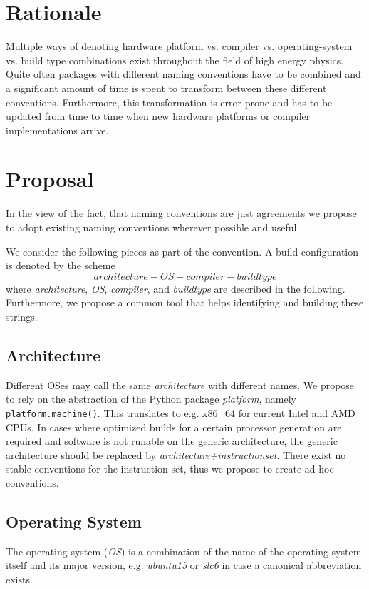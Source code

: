 \documentclass[12pt,a4paper]{article}
\begin{document}
\pagestyle{plain} %
\setcounter{page}{1}

\section{Rationale}

Multiple ways of denoting hardware platform vs. compiler vs. operating-system vs. build type combinations exist throughout the field of high energy physics. Quite often packages with different naming conventions have to be combined and a significant amount of time is spent to transform between these different conventions. Furthermore, this transformation is error prone and has to be updated from time to time when new hardware platforms or compiler implementations arrive.

\section{Proposal}

In the view of the fact, that naming conventions are just agreements we propose to adopt existing naming conventions wherever possible and useful. 

We consider the following pieces as part of the convention. A build configuration is denoted by the scheme
\[architecture-OS-compiler-buildtype\]
where \emph{architecture}, \emph{OS}, \emph{compiler}, and \emph{buildtype} are described in the following. Furthermore, we propose a common tool that helps identifying and building these strings. 

\subsection{Architecture}

Different OSes may call the same \emph{architecture} with different names. We propose to rely on the abstraction of the Python package \emph{platform}, namely \texttt{platform.machine()}. This translates to e.g. x86\_64 for current Intel and AMD CPUs. In cases where optimized builds for a certain processor generation are required and software is not runable on the generic architecture, the generic architecture should be replaced by \emph{architecture+instructionset}. 
There exist no stable conventions for the instruction set, thus we propose to create ad-hoc conventions. 

\subsection{Operating System}
The operating system (\emph{OS}) is a combination of the name of the operating system itself and its major version, e.g. \emph{ubuntu15} or \emph{slc6} in case a canonical abbreviation exists. 
\end{document}
